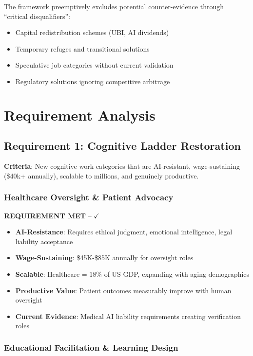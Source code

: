 \documentclass[11pt,a4paper]{article}
\newcommand{\greencheckmark}{{\color{validationgreen}\textbf{$\checkmark$}}}
\newcommand{\requirement}[1]{\textcolor{secondaryblue}{\textbf{#1}}}
\newcommand{\evidence}[1]{\textcolor{validationgreen}{\textbf{#1}}}
\begin{document}
The framework preemptively excludes potential counter-evidence through ``critical disqualifiers'':

\begin{itemize}[leftmargin=*]
\item Capital redistribution schemes (UBI, AI dividends)
\item Temporary refuges and transitional solutions
\item Speculative job categories without current validation
\item Regulatory solutions ignoring competitive arbitrage
\end{itemize}

\pagebreak
\section{Requirement Analysis}

\subsection{Requirement 1: Cognitive Ladder Restoration}

\requirement{Criteria}: New cognitive work categories that are AI-resistant, wage-sustaining (\$40k+ annually), scalable to millions, and genuinely productive.

\subsubsection{Healthcare Oversight \& Patient Advocacy}

\evidence{REQUIREMENT MET} -- \greencheckmark

\begin{itemize}[leftmargin=*]
\item \textbf{AI-Resistance}: Requires ethical judgment, emotional intelligence, legal liability acceptance
\item \textbf{Wage-Sustaining}: \$45K-\$85K annually for oversight roles
\item \textbf{Scalable}: Healthcare = 18\% of US GDP, expanding with aging demographics
\item \textbf{Productive Value}: Patient outcomes measurably improve with human oversight
\item \textbf{Current Evidence}: Medical AI liability requirements creating verification roles
\end{itemize}

\subsubsection{Educational Facilitation \& Learning Design}
\end{document}
